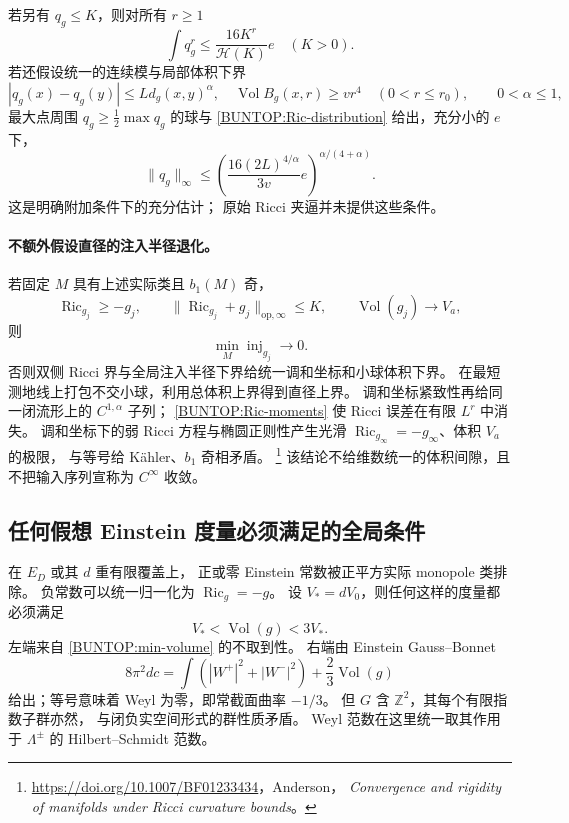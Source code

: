\documentclass[UTF8,fontset=fandol,zihao=-4,oneside,openany]{ctexbook}
\theoremstyle{cjkplain}
\numberwithin{equation}{chapter}
\begin{document}
若另有 \(q_g\le K\)，则对所有 \(r\ge1\)
\begin{equation}
 \int q_g^r\le\frac{16K^r}{\mathcal H(K)}e \quad(K>0).
 \label{BUNTOP:Ric-moments}
\end{equation}
若还假设统一的连续模与局部体积下界
\[
 |q_g(x)-q_g(y)|\le Ld_g(x,y)^\alpha,\quad
 \operatorname{Vol}B_g(x,r)\ge vr^4
 \quad(0<r\le r_0),\qquad 0<\alpha\le1,
\]
最大点周围 \(q_g\ge\frac12\max q_g\) 的球与
\eqref{BUNTOP:Ric-distribution} 给出，充分小的 \(e\) 下，
\begin{equation}
 \|q_g\|_\infty
 \le
 \left(\frac{16(2L)^{4/\alpha}}{3v}e\right)^{\alpha/(4+\alpha)} .
 \label{BUNTOP:Ric-Linfty-extra}
\end{equation}
这是明确附加条件下的充分估计；
原始 Ricci 夹逼并未提供这些条件。

\paragraph{不额外假设直径的注入半径退化。}
若固定 \(M\) 具有上述实际类且 \(b_1(M)\) 奇，
\[
 \operatorname{Ric}_{g_j}\ge-g_j,\qquad
 \|\operatorname{Ric}_{g_j}+g_j\|_{\mathrm{op},\infty}\le K,\qquad
 \operatorname{Vol}(g_j)\to V_a,
\]
则
\begin{equation}
 \min_M\operatorname{inj}_{g_j}\longrightarrow0 .
 \label{BUNTOP:inj-collapse}
\end{equation}
否则双侧 Ricci 界与全局注入半径下界给统一调和坐标和小球体积下界。
在最短测地线上打包不交小球，利用总体积上界得到直径上界。
调和坐标紧致性再给同一闭流形上的 \(C^{1,\alpha}\) 子列；
\eqref{BUNTOP:Ric-moments} 使 Ricci 误差在有限 \(L^r\) 中消失。
调和坐标下的弱 Ricci 方程与椭圆正则性产生光滑
\(\operatorname{Ric}_{g_\infty}=-g_\infty\)、体积 \(V_a\) 的极限，
与等号给 K\"ahler、\(b_1\) 奇相矛盾。%
\footnote{\url{https://doi.org/10.1007/BF01233434}，Anderson，
\emph{Convergence and rigidity of manifolds under Ricci curvature bounds}。}
该结论不给维数统一的体积间隙，且不把输入序列宣称为
\(C^\infty\) 收敛。

\subsection{任何假想 Einstein 度量必须满足的全局条件}
\label{BUNTOP:Einstein-necessary}

在 \(E_D\) 或其 \(d\) 重有限覆盖上，
正或零 Einstein 常数被正平方实际 monopole 类排除。
负常数可以统一归一化为 \(\operatorname{Ric}_g=-g\)。
设 \(V_* =dV_0\)，则任何这样的度量都必须满足
\begin{equation}
 V_*<\operatorname{Vol}(g)<3V_* .
 \label{BUNTOP:Einstein-volume}
\end{equation}
左端来自 \eqref{BUNTOP:min-volume} 的不取到性。
右端由 Einstein Gauss--Bonnet
\[
 8\pi^2dc=\int(|W^+|^2+|W^-|^2)+\frac23\operatorname{Vol}(g)
\]
给出；等号意味着 Weyl 为零，即常截面曲率 \(-1/3\)。
但 \(G\) 含 \(\mathbb Z^2\)，其每个有限指数子群亦然，
与闭负实空间形式的群性质矛盾。
Weyl 范数在这里统一取其作用于 \(\Lambda^\pm\) 的
Hilbert--Schmidt 范数。
\end{document}

